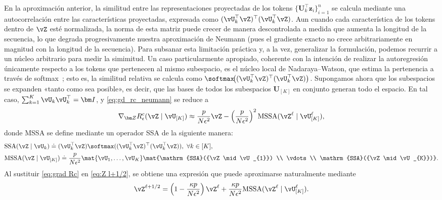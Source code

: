 \documentclass[../../book-main.tex]{subfiles}
\begin{document}
En la aproximación anterior, la similitud entre las
representaciones proyectadas de los tokens
$\{\bm U_k^\top\bm z_i\}_{i = 1}^{n}$ se calcula mediante
una autocorrelación entre las características proyectadas,
expresada como $(\vU_{k}^\top\vZ)^\top(\vU_{k}^\top\vZ)$.
Aun cuando cada característica de los tokens dentro de
$\vZ$ esté normalizada, la norma de esta matriz puede
crecer de manera descontrolada a medida que aumenta la
longitud de la secuencia, lo que degrada progresivamente
nuestra aproximación de Neumann (pues el gradiente exacto
no crece arbitrariamente en magnitud con la longitud de la
secuencia). Para subsanar esta limitación práctica y, a la
vez, generalizar la formulación, podemos recurrir a un
núcleo arbitrario para medir la simimitud. Un caso
particularmente apropiado, coherente con la intención de
realizar la autoregresión únicamente respecto a los tokens
que pertenecen al mismo subespacio, es el núcleo local de
Nadaraya--Watson, que estima la pertenencia a través de
softmax~\citep{chaudhari2021attentive}; esto es, la
similitud relativa se calcula como
$\softmax\!\bigl((\vU_{k}^\top\vZ)^\top(\vU_{k}^\top\vZ)\bigr)$.
Supongamos ahora que los subespacios se expanden «tanto
como sea posible», es decir, que las bases de todos los
subespacios $\bm U_{[K]}$ en conjunto generan todo el
espacio. En tal caso,
$\sum_{k = 1}^{K} \vU_{k}\vU_{k}^\top = \bm I$, y
\eqref{eq:gd_rc_neumann} se reduce a
\begin{align}\label{eq:grad Rc}
    \nabla_{\bm Z} R_{\epsilon}^{c}(\vZ \mid \vU_{[K]})
    \approx  \frac{p}{N\epsilon^2} \vZ -  \left(
    \frac{p}{N\epsilon^2}\right)^2 \operatorname{MSSA}(\vZ^{\ell} \mid
    \vU_{[K]}^{\ell}),
\end{align}
donde MSSA se define mediante un operador SSA de la siguiente manera:
\begin{align}
    & \mathrm{SSA}(\vZ \mid \vU_{k})
    \doteq (\vU_{k}^\top
    \vZ)\softmax((\vU_{k}^\top\vZ)^\top(\vU_{k}^\top\vZ)),
    \ \forall k \in [K], \label{eq:SSA} \\
    & \mathrm{MSSA}(\vZ \mid \vU_{[K]})
    \doteq \frac{p}{N\epsilon^2} \mat{\vU_{1}, \dots,
    \vU_{K}}\mat{\mathrm{SSA}({\vZ \mid \vU_{1}}) \\ \vdots
    \\ \mathrm{SSA}({\vZ \mid \vU_{K}})}.\label{eq:Multi-Head-SSA}
\end{align}
Al sustituir \eqref{eq:grad Rc} en \eqref{eq:Z l+1/2}, se obtiene 
una expresión que puede aproximarse naturalmente mediante
\begin{equation}
    \vZ^{\ell + 1/2} = \left(1 - \frac{\kappa p}{N\epsilon^2}\right)
    \vZ^{\ell} + \frac{\kappa p}{N\epsilon^2}
    \mathrm{MSSA}(\vZ^{\ell} \mid \vU_{[K]}^{\ell}).
    \label{eq:gd-mcr-parts}
\end{equation}
\end{document}
